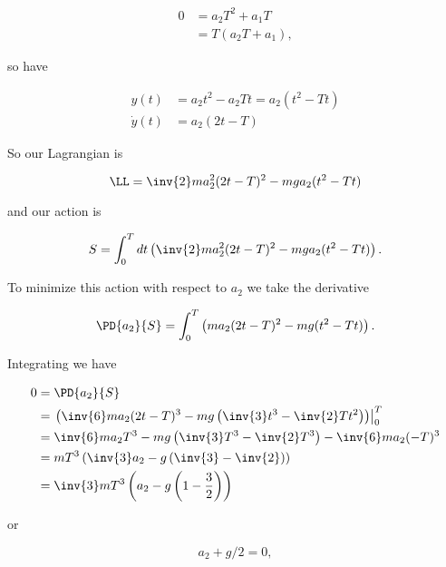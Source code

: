 \begin{align*}
0 
&= 
a_2 T^2 + a_1 T \\
&= T( a_2 T + a_1 ),
\end{align*}

so have

\begin{align}\label{eqn:classicalMechanicsPs1:220}
y(t) &= a_2 t^2 - a_2 T t = a_2 (t^2 - T t) \\
\dot{y}(t) &= 
a_2 (2 t - T )
\end{align}

So our Lagrangian is 

\begin{equation}\label{eqn:classicalMechanicsPs1:240}
\LL = 
\inv{2} m a_2^2 (2 t - T )^2 - m g a_2 (t^2 - T t)
\end{equation}

and our action is

\begin{equation}\label{eqn:classicalMechanicsPs1:260}
S = \int_0^T dt 
\left( 
\inv{2} m a_2^2 (2 t - T )^2 - m g a_2 (t^2 - T t)
\right).
\end{equation}

To minimize this action with respect to $a_2$ we take the derivative

\begin{equation}\label{eqn:classicalMechanicsPs1:280}
\PD{a_2}{S} = \int_0^T
\left( 
m a_2 (2 t - T )^2 - m g (t^2 - T t)
\right).
\end{equation}

Integrating we have

\begin{align*}
0 &= \PD{a_2}{S} \\
&={\left.
\left(
\inv{6} m a_2 (2 t - T )^3 - m g \left(\inv{3}t^3 - \inv{2}T t^2 \right)
\right)\right\vert}_0^T \\
&=
\inv{6} m a_2 T^3 - m g \left(\inv{3}T^3 - \inv{2}T^3 \right)
-
\inv{6} m a_2 (- T )^3 \\
&=
m T^3 \left( \inv{3} a_2 - g \left( \inv{3} - \inv{2} \right) \right) \\
&=
\inv{3} m T^3 \left( a_2 - g \left( 1 - \frac{3}{2} \right) \right) \\
\end{align*}

or

\begin{equation}\label{eqn:classicalMechanicsPs1:300}
a_2 + g/2 = 0,
\end{equation}

